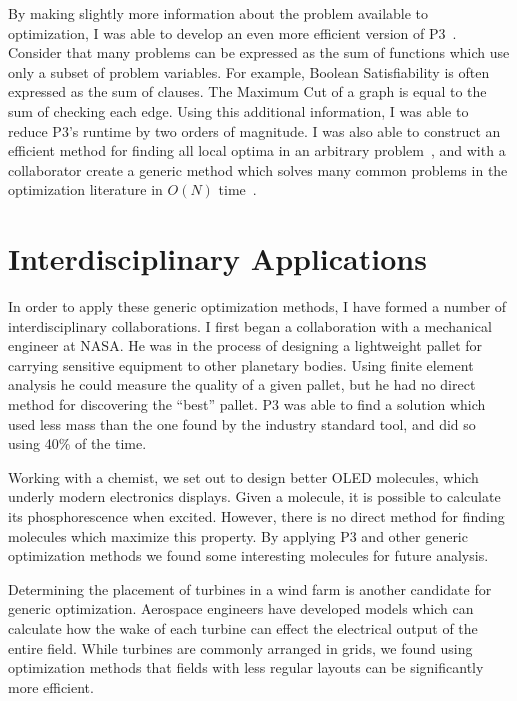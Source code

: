 \documentclass[a4paper, 11pt]{article}
\begin{document}
By making slightly more information about the problem available to optimization, I was
able to develop an even more efficient version of P3~\cite{goldman:2015:GBO}. Consider
that many problems can be expressed as the sum of functions which use only a subset
of problem variables. For example, Boolean Satisfiability is often expressed as the sum
of clauses. The Maximum Cut of a graph is equal to the sum of checking each edge.
Using this additional information, I was able to reduce P3's runtime by two
orders of magnitude. I was also able to construct an efficient method
for finding all local optima in an arbitrary problem~\cite{goldman:2016:hyperplane},
and with a collaborator create a generic method which solves many common
problems in the optimization literature in $O(N)$ time~\cite{whitley:2016:mkl}.

\section{Interdisciplinary Applications}
In order to apply these generic optimization methods, I have formed a number of
interdisciplinary collaborations. I first began a collaboration with a mechanical engineer
at NASA. He was in the process of designing a lightweight pallet for carrying sensitive
equipment to other planetary bodies. Using finite element analysis he could measure
the quality of a given pallet, but he had no direct method for discovering the ``best'' pallet.
P3 was able to find a solution which used less mass than the one found by the industry standard
tool, and did so using 40\% of the time.


Working with a chemist, we set out to
design better OLED molecules, which underly modern electronics displays.
Given a molecule, it is possible to calculate its phosphorescence when excited. However,
there is no direct method for finding molecules which maximize this property.
By applying P3 and other generic optimization methods we found some interesting
molecules for future analysis.

Determining the placement of turbines in a wind farm is another candidate for
generic optimization. Aerospace engineers have developed models which can calculate
how the wake of each turbine can effect the electrical output of the entire field.
While turbines are commonly arranged in grids, we found using optimization methods
that fields with less regular layouts can be significantly more efficient.
\end{document}
